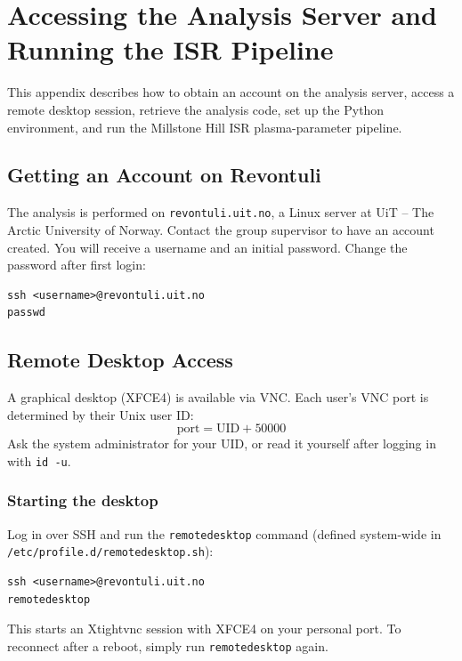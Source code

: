 
\section{Accessing the Analysis Server and Running the ISR Pipeline}
\label{app:analysis_guide}

This appendix describes how to obtain an account on the analysis server,
access a remote desktop session, retrieve the analysis code, set up the
Python environment, and run the Millstone Hill ISR plasma-parameter pipeline.

\subsection{Getting an Account on Revontuli}

The analysis is performed on \texttt{revontuli.uit.no}, a Linux server at
UiT -- The Arctic University of Norway.
Contact the group supervisor to have an account created.
You will receive a username and an initial password.
Change the password after first login:
\begin{verbatim}
ssh <username>@revontuli.uit.no
passwd
\end{verbatim}

\subsection{Remote Desktop Access}

A graphical desktop (XFCE4) is available via VNC.
Each user's VNC port is determined by their Unix user ID:
\begin{equation}
  \text{port} = \text{UID} + 50000
\end{equation}
Ask the system administrator for your UID, or read it yourself after
logging in with \texttt{id -u}.

\subsubsection*{Starting the desktop}

Log in over SSH and run the \texttt{remotedesktop} command (defined
system-wide in \texttt{/etc/profile.d/remotedesktop.sh}):
\begin{verbatim}
ssh <username>@revontuli.uit.no
remotedesktop
\end{verbatim}
This starts an Xtightvnc session with XFCE4 on your personal port.
To reconnect after a reboot, simply run \texttt{remotedesktop} again.

